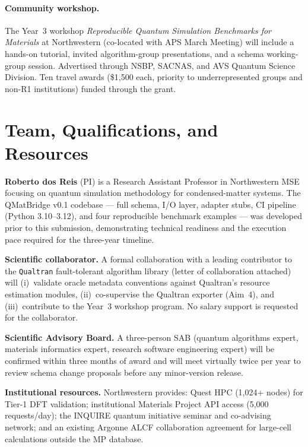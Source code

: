 \documentclass[11pt]{article}
\begin{document}
\paragraph{Community workshop.}
The Year~3 workshop \emph{Reproducible Quantum Simulation Benchmarks
for Materials} at Northwestern (co-located with APS March Meeting) will
include a hands-on tutorial, invited algorithm-group presentations, and
a schema working-group session.
Advertised through NSBP, SACNAS, and AVS Quantum Science Division.
Ten travel awards (\$1{,}500 each, priority to underrepresented groups
and non-R1 institutions) funded through the grant.

\section{Team, Qualifications, and Resources}

\textbf{Roberto dos Reis} (PI) is a Research Assistant Professor in
Northwestern MSE focusing on quantum simulation methodology for
condensed-matter systems.
The QMatBridge v0.1 codebase --- full schema, I/O layer, adapter stubs,
CI pipeline (Python 3.10--3.12), and four reproducible benchmark examples
--- was developed prior to this submission, demonstrating technical
readiness and the execution pace required for the three-year timeline.

\textbf{Scientific collaborator.}
A formal collaboration with a leading contributor to the
\texttt{Qualtran} fault-tolerant algorithm library (letter of collaboration
attached) will (i)~validate oracle metadata conventions against Qualtran's
resource estimation modules, (ii)~co-supervise the Qualtran exporter
(Aim~4), and (iii)~contribute to the Year~3 workshop program.
No salary support is requested for the collaborator.

\textbf{Scientific Advisory Board.}
A three-person SAB (quantum algorithms expert, materials informatics
expert, research software engineering expert) will be confirmed within
three months of award and will meet virtually twice per year to review
schema change proposals before any minor-version release.

\textbf{Institutional resources.}
Northwestern provides: Quest HPC (1,024+ nodes) for Tier-1 DFT validation;
institutional Materials Project API access (5,000 requests/day);
the INQUIRE quantum initiative seminar and co-advising network; and
an existing Argonne ALCF collaboration agreement for large-cell
calculations outside the MP database.
\end{document}
